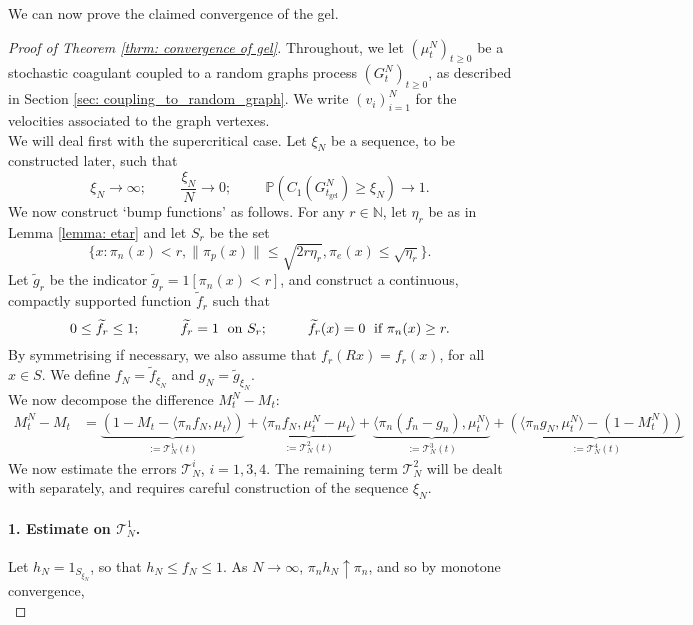    We can now prove the claimed convergence of the gel.
   \begin{proof}[Proof of Theorem \ref{thrm: convergence of gel}] Throughout, we let $(\mu^N_t)_{t\geq 0}$ be a stochastic coagulant coupled to a random graphs process $(G^N_t)_{t\geq 0}$, as described in Section \ref{sec: coupling_to_random_graph}. We write $(v_i)_{i=1}^N$ for the velocities associated to the graph vertexes. \medskip \\ We will deal first with the supercritical case. Let $\xi_N$ be a sequence, to be constructed later, such that \begin{equation}
       \xi_N\rightarrow \infty; \hspace{1cm} \frac{\xi_N}{N}\rightarrow 0; \hspace{1cm}\mathbb{P}(C_1(G^N_{t_\text{gel}})\geq \xi_N)\rightarrow 1.
   \end{equation}  We now construct `bump functions' as follows.  For any $r \in \mathbb{N}$, let $\eta_r$ be as in Lemma \ref{lemma: etar} and let $S_r$ be the set \begin{equation}\label{eq: choice of xiN}
       \{x: \pi_n(x)< r, \|\pi_p(x)\|\leq \sqrt{2r\eta_r}, \pi_e(x)\leq \sqrt{\eta_r}\}.
   \end{equation} Let $\widetilde{g}_r$ be the indicator $\widetilde{g}_r=1[\pi_n(x)< r]$, and construct a continuous, compactly supported function $\widetilde{f}_r$ such that \begin{equation}
      0\leq \widetilde{f}_r\leq 1;\hspace{1cm} \widetilde{f}_r=1 \hspace{0.1cm} \text{ on } S_r;\hspace{1cm} \widetilde{f}_r(x)=0 \hspace{0.1cm} \text{ if } \pi_n(x)\ge r.
   \end{equation} By symmetrising if necessary, we also assume that $f_r(Rx)=f_r(x)$, for all $x\in S$. We define $f_N=\widetilde{f}_{\xi_N}$ and $g_N=\widetilde{g}_{\xi_N}$. \medskip \\ We now decompose the difference $M^N_t-M_t:$ \begin{equation}\label{eq: decomposition of erorr}\begin{split} M^N_t-M_t &= \underbrace{(1-M_t-\langle \pi_n f_N, \mu_t\rangle)}_{:=\mathcal{T}^1_N(t)} + \underbrace{\langle \pi_n f_N, \mu^N_t-\mu_t\rangle}_{:=\mathcal{T}^2_N(t)} + \underbrace{\langle \pi_n (f_n-g_n), \mu^N_t\rangle}_{:=\mathcal{T}^3_N(t)} +\underbrace{(
   \langle \pi_n g_N, \mu^N_t\rangle - (1-M^N_t))}_{:=\mathcal{T}^4_N(t)}\end{split} \end{equation} We now estimate the errors $\mathcal{T}^i_N$, $i=1,3,4.$ The remaining term $\mathcal{T}^2_N$ will be dealt with separately, and requires careful construction of the sequence $\xi_N$. \paragraph{1. Estimate on $\mathcal{T}^1_N$.} Let $h_N=1_{S_{\xi_N}}$, so that $h_N \le f_N \le 1$. As $N\rightarrow \infty$, $\pi_n h_N \uparrow \pi_n$, and so by monotone convergence, \begin{equation}

\end{equation}
\end{proof}
